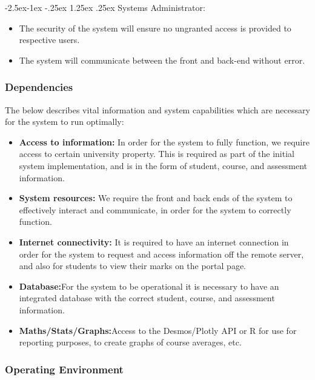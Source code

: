 \documentclass[paper=a4, fontsize=11pt]{scrartcl}
\makeatletter
\numberwithin{equation}{section}		%
\numberwithin{figure}{section}			%
\numberwithin{table}{section}				%
\renewcommand\paragraph{\@startsection{paragraph}{4}{\z@}%
            {-2.5ex\@plus -1ex \@minus -.25ex}%
            {1.25ex \@plus .25ex}%
            {\normalfont\normalsize\bfseries}}
\makeatother
\begin{document}
\paragraph{Systems Administrator:}
\begin{itemize}
\item The security of the system will ensure no ungranted access is provided to respective
users.
\item The system will communicate between the front and back-end without error. \\
\end{itemize}


\subsubsection{Dependencies}

The below describes vital information and system capabilities which are necessary for the system to run optimally:

\begin{itemize}
\item \textbf{Access to information:} In order for the system to fully function, we require access to certain university property. This is required as part of the initial system implementation, and is in the form of student, course, and assessment information.
\item \textbf{System resources:} We require the front and back ends of the system to effectively interact and communicate, in order for the system to correctly function.
 
\item \textbf{Internet connectivity:} It is required to have an internet connection in order for the system to request and access information off the remote server, and also for students to view their marks on the portal page.

\item \textbf{Database:}For the system to be operational it is necessary to have an integrated database with the correct student, course, and assessment information.

\item \textbf{Maths/Stats/Graphs:}Access to the Desmos/Plotly API or R for use for reporting purposes, to create graphs of course averages, etc.
\end{itemize}





\subsubsection{Operating Environment}
\end{document}
